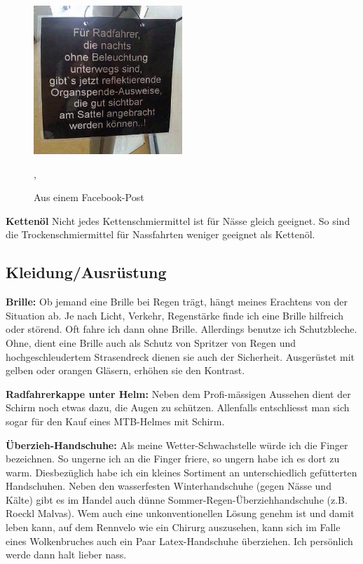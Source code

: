 \begin{figure}[htpb]
  \centering
  \includegraphics[width=0.5\textwidth]{figures/ohne-beleuchtung.jpg}
  \caption{Aus einem Facebook-Post \protect\cite{officepony2016organspendeausweis}},
  \label{fig:ohne-beleuchtung}
\end{figure}

\textbf{Kettenöl}
Nicht jedes Kettenschmiermittel ist für Nässe gleich geeignet. So sind die Trockenschmiermittel
für Nassfahrten weniger geeignet als Kettenöl.

\subsection{Kleidung/Ausrüstung}

\textbf{Brille:}
Ob jemand eine Brille bei Regen trägt, hängt meines Erachtens von der Situation ab.
Je nach Licht, Verkehr, Regenstärke finde ich eine Brille hilfreich oder störend.
Oft fahre ich dann ohne Brille.
Allerdings benutze ich Schutzbleche.
Ohne, dient eine Brille auch als Schutz von Spritzer von Regen und hochgeschleudertem Strasendreck dienen sie auch der Sicherheit.
Ausgerüstet mit gelben oder orangen Gläsern, erhöhen sie den Kontrast.

\textbf{Radfahrerkappe unter Helm:}
Neben dem Profi-mässigen Aussehen dient der Schirm noch etwas dazu, die Augen zu schützen.
Allenfalls entschliesst man sich sogar für den Kauf eines MTB-Helmes mit Schirm.

\textbf{Überzieh-Handschuhe:}
Als meine Wetter-Schwachstelle würde ich die Finger bezeichnen.
So ungerne ich an die Finger friere, so ungern habe ich es dort zu warm.
Diesbezüglich habe ich ein kleines Sortiment an unterschiedlich gefütterten Handschuhen.
Neben den wasserfesten Winterhandschuhe (gegen Nässe und Kälte) gibt es im Handel auch dünne Sommer-Regen-Überziehhandschuhe
(z.B. Roeckl Malvas).
Wem auch eine unkonventionellen Lösung genehm ist und damit leben kann, auf dem Rennvelo wie ein Chirurg auszusehen,
kann sich im Falle eines Wolkenbruches auch ein Paar Latex-Handschuhe überziehen.
Ich persönlich werde dann halt lieber nass.

